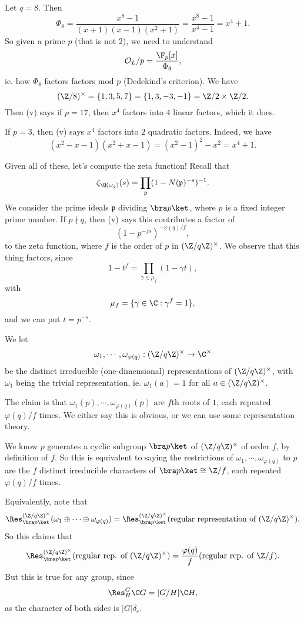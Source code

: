 \documentclass[a4paper]{article}
\begin{document}
\begin{eg}
  Let $q = 8$. Then
  \[
    \Phi_8 = \frac{x^8 - 1}{(x + 1)(x - 1)(x^2 + 1)} = \frac{x^8 - 1}{x^4 - 1} = x^4 + 1.
  \]
  So given a prime $p$ (that is not $2$), we need to understand
  \[
    \mathcal{O}_L/p = \frac{\F_p[x]}{\Phi_8},
  \]
  ie. how $\Phi_8$ factors factors mod $p$ (Dedekind's criterion). We have
  \[
    (\Z/8)^\times = \{1, 3, 5, 7\} = \{1, 3, -3, -1\} = \Z/2 \times \Z/2.
  \]
  Then (v) says if $p = 17$, then $x^4$ factors into $4$ linear factors, which it does.

  If $p = 3$, then (v) says $x^4$ factors into $2$ quadratic factors. Indeed, we have
  \[
    (x^2 - x - 1)(x^2 + x - 1) = (x^2 - 1)^2 - x^2 = x^4 + 1.
  \]
\end{eg}

Given all of these, let's compute the zeta function! Recall that
\[
  \zeta_{\Q(\omega_q)}(s) = \prod_{\mathfrak{p}}(1 - N(\mathfrak{p})^{-s})^{-1}.
\]
We consider the prime ideals $\mathfrak{p}$ dividing $\bra p\ket$, where $p$ is a fixed integer prime number. If $p \nmid q$, then (v) says this contributes a factor of
\[
  (1 - p^{-fs})^{-\varphi(q)/f},
\]
to the zeta function, where $f$ is the order of $p$ in $(\Z/q\Z)^\times$. We observe that this thing factors, since
\[
  1 - t^f = \prod_{\gamma \in \mu_f}(1 - \gamma t),
\]
with
\[
  \mu_f = \{\gamma \in \C: \gamma^f = 1\},
\]
and we can put $t = p^{-s}$.

We let
\[
  \omega_1, \cdots, \omega_{\varphi(q)}: (\Z/q\Z)^\times \to \C^\times
\]
be the distinct irreducible (one-dimensional) representations of $(\Z/q\Z)^\times$, with $\omega_1$ being the trivial representation, ie. $\omega_1(a) = 1$ for all $a \in (\Z/q\Z)^\times$.

The claim is that $\omega_1(p), \cdots, \omega_{\varphi(q)}(p)$ are $f$th roots of $1$, each repeated $\varphi(q)/f$ times. We either say this is obvious, or we can use some representation theory.

We know $p$ generates a cyclic subgroup $\bra p\ket$ of $(\Z/q\Z)^\times$ of order $f$, by definition of $f$. So this is equivalent to saying the restrictions of $\omega_1, \cdots, \omega_{\varphi(q)}$ to $p$ are the $f$ distinct irreducible characters of $\bra p\ket \cong \Z/f$, each repeated $\varphi(q)/f$ times.

Equivalently, note that
\[
  \Res^{(\Z/q\Z)^\times}_{\bra p\ket} (\omega_1 \oplus \cdots \oplus \omega_{\varphi(q)}) = \Res_{\bra p\ket}^{(\Z/q\Z)^\times}(\text{regular representation of }(\Z/q\Z)^\times).
\]
So this claims that
\[
  \Res_{\bra p\ket}^{(\Z/q\Z)^\times} (\text{regular rep. of }(\Z/q\Z)^\times) = \frac{\varphi(q)}{f} (\text{regular rep. of }\Z/f).
\]
But this is true for any group, since
\[
  \Res_H^G \C G = |G/H| \C H,
\]
as the character of both sides is $|G| \delta_e$.
\end{document}
